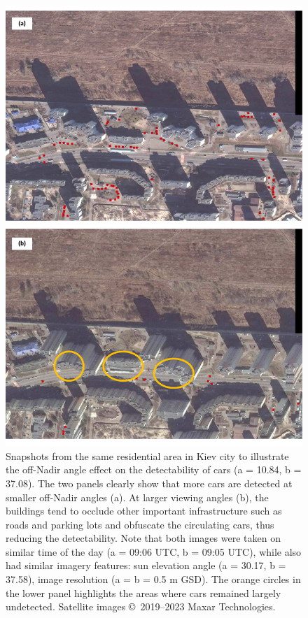 \documentclass[sn-basic]{sn-jnl}%
\begin{document}
{\begin{appendices}
\begin{figure}[htbp]
\begin{center}
\includegraphics[scale = 0.5]{Figures/OffNadir_final.pdf}
\end{center}
\caption{Snapshots from the same residential area in Kiev city to illustrate the off-Nadir angle effect on the detectability of cars (a = 10.84\textdegree, b = 37.08\textdegree).
The two panels clearly show that more cars are detected at smaller off-Nadir angles (a). At larger viewing angles (b), the buildings tend to occlude other important infrastructure such as roads and parking lots and obfuscate the circulating cars, thus reducing the detectability.  Note that both images were taken on similar time of the day (a = 09:06 UTC, b = 09:05 UTC), while also had similar imagery features: sun elevation angle (a = 30.17\textdegree , b = 37.58\textdegree), image resolution (a = b = 0.5 m GSD). The orange circles in the lower panel highlights the areas where cars remained largely undetected. Satellite images \copyright ~2019--2023 Maxar Technologies.
}
\label{figSM_OffNadir}
\end{figure}



\end{appendices}}
\end{document}
